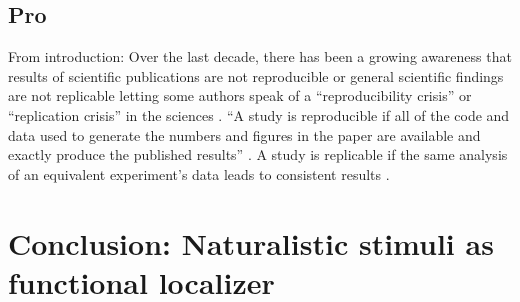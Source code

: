 \subsection{Pro}




From introduction:
Over the last decade, there has been a growing awareness that results of
scientific publications are not reproducible or general scientific findings are
not replicable letting some authors speak of a ``reproducibility crisis'' or
``replication crisis'' in the sciences \citep{baker2016reproducibility,
plesser2018reproducibility, stupple2019reproducibility, nosek2022replicability}.
``A study is reproducible if all of the code and data used to generate the
numbers and figures in the paper are available and exactly produce the published
results'' \citep{leek2017most}.
A study is replicable if the same analysis of an equivalent experiment's data
leads to consistent results \citep{dubois2016building, leek2017most}.


\section{Conclusion: Naturalistic stimuli as functional localizer}

